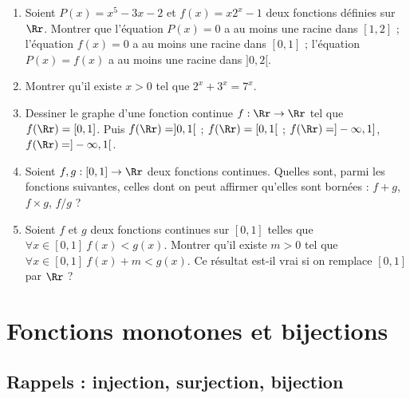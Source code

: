 \documentclass[class=report,crop=false]{standalone}
\begin{document}

\begin{miniexercices}
\sauteligne
\begin{enumerate}
  \item Soient $P(x)=x^5-3x-2$ et $f(x)=x2^x-1$ deux fonctions définies sur $\Rr$. Montrer que
   l'équation $P(x)=0$ a au moins une racine dans $[1,2]$ ;
   l'équation $f(x)=0$ a au moins une racine dans $[0,1]$ ;
   l'équation $P(x)=f(x)$ a au moins une racine dans $]0,2[$.

  \item Montrer qu'il existe $x>0$ tel que $2^x+3^x=7^x$.

  \item Dessiner le graphe d'une fonction continue $f : \Rr \to \Rr$ tel que $f(\Rr) = [0,1]$.
  Puis $f(\Rr)=]0,1[$ ; $f(\Rr) = [0,1[$ ; $f(\Rr)= ]-\infty,1]$, $f(\Rr)= ]-\infty,1[$.

  \item Soient $f,g : [0,1] \to \Rr$ deux fonctions continues. %
Quelles sont, parmi les fonctions suivantes, celles dont on peut affirmer qu'elles sont bornées : $f+g$, $f\times g$, $f/g$ ?

  \item Soient $f$ et $g$ deux fonctions continues sur $[0,1]$ telles que $\forall x\in [0,1] \ f(x)<g(x)$.
  Montrer qu'il existe $m>0$ tel que $\forall x\in [0,1] \ f(x)+m<g(x)$. Ce résultat
  est-il vrai si on remplace $[0,1]$ par $\Rr$ ?

\end{enumerate}
\end{miniexercices}



\section{Fonctions monotones et bijections}
\subsection{Rappels : injection, surjection, bijection}
\end{document}
